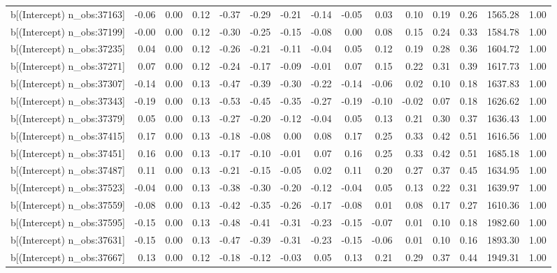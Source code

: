 \begin{table}[ht]
\begin{tabular}{rrrrrrrrrrrrrrr}
  b[(Intercept) n\_obs:37163] & -0.06 & 0.00 & 0.12 & -0.37 & -0.29 & -0.21 & -0.14 & -0.05 & 0.03 & 0.10 & 0.19 & 0.26 & 1565.28 & 1.00 \\ 
  b[(Intercept) n\_obs:37199] & -0.00 & 0.00 & 0.12 & -0.30 & -0.25 & -0.15 & -0.08 & 0.00 & 0.08 & 0.15 & 0.24 & 0.33 & 1584.78 & 1.00 \\ 
  b[(Intercept) n\_obs:37235] & 0.04 & 0.00 & 0.12 & -0.26 & -0.21 & -0.11 & -0.04 & 0.05 & 0.12 & 0.19 & 0.28 & 0.36 & 1604.72 & 1.00 \\ 
  b[(Intercept) n\_obs:37271] & 0.07 & 0.00 & 0.12 & -0.24 & -0.17 & -0.09 & -0.01 & 0.07 & 0.15 & 0.22 & 0.31 & 0.39 & 1617.73 & 1.00 \\ 
  b[(Intercept) n\_obs:37307] & -0.14 & 0.00 & 0.13 & -0.47 & -0.39 & -0.30 & -0.22 & -0.14 & -0.06 & 0.02 & 0.10 & 0.18 & 1637.83 & 1.00 \\ 
  b[(Intercept) n\_obs:37343] & -0.19 & 0.00 & 0.13 & -0.53 & -0.45 & -0.35 & -0.27 & -0.19 & -0.10 & -0.02 & 0.07 & 0.18 & 1626.62 & 1.00 \\ 
  b[(Intercept) n\_obs:37379] & 0.05 & 0.00 & 0.13 & -0.27 & -0.20 & -0.12 & -0.04 & 0.05 & 0.13 & 0.21 & 0.30 & 0.37 & 1636.43 & 1.00 \\ 
  b[(Intercept) n\_obs:37415] & 0.17 & 0.00 & 0.13 & -0.18 & -0.08 & 0.00 & 0.08 & 0.17 & 0.25 & 0.33 & 0.42 & 0.51 & 1616.56 & 1.00 \\ 
  b[(Intercept) n\_obs:37451] & 0.16 & 0.00 & 0.13 & -0.17 & -0.10 & -0.01 & 0.07 & 0.16 & 0.25 & 0.33 & 0.42 & 0.51 & 1685.18 & 1.00 \\ 
  b[(Intercept) n\_obs:37487] & 0.11 & 0.00 & 0.13 & -0.21 & -0.15 & -0.05 & 0.02 & 0.11 & 0.20 & 0.27 & 0.37 & 0.45 & 1634.95 & 1.00 \\ 
  b[(Intercept) n\_obs:37523] & -0.04 & 0.00 & 0.13 & -0.38 & -0.30 & -0.20 & -0.12 & -0.04 & 0.05 & 0.13 & 0.22 & 0.31 & 1639.97 & 1.00 \\ 
  b[(Intercept) n\_obs:37559] & -0.08 & 0.00 & 0.13 & -0.42 & -0.35 & -0.26 & -0.17 & -0.08 & 0.01 & 0.08 & 0.17 & 0.27 & 1610.36 & 1.00 \\ 
  b[(Intercept) n\_obs:37595] & -0.15 & 0.00 & 0.13 & -0.48 & -0.41 & -0.31 & -0.23 & -0.15 & -0.07 & 0.01 & 0.10 & 0.18 & 1982.60 & 1.00 \\ 
  b[(Intercept) n\_obs:37631] & -0.15 & 0.00 & 0.13 & -0.47 & -0.39 & -0.31 & -0.23 & -0.15 & -0.06 & 0.01 & 0.10 & 0.16 & 1893.30 & 1.00 \\ 
  b[(Intercept) n\_obs:37667] & 0.13 & 0.00 & 0.12 & -0.18 & -0.12 & -0.03 & 0.05 & 0.13 & 0.21 & 0.29 & 0.37 & 0.44 & 1949.31 & 1.00 \\ 

\end{tabular}
\end{table}
